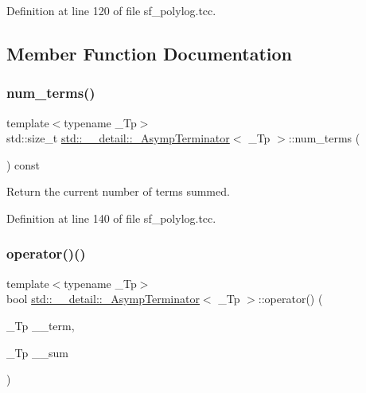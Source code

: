 Definition at line 120 of file sf\+\_\+polylog.\+tcc.



\subsection{Member Function Documentation}
\mbox{\label{classstd_1_1____detail_1_1__AsympTerminator_a463f9e4e87d22b9839c12cc28b085117}} 
\subsubsection{\texorpdfstring{num\+\_\+terms()}{num\_terms()}}
{\footnotesize\ttfamily template$<$typename \+\_\+\+Tp$>$ \\
std\+::size\+\_\+t \hyperlink{classstd_1_1____detail_1_1__AsympTerminator}{std\+::\+\_\+\+\_\+detail\+::\+\_\+\+Asymp\+Terminator}$<$ \+\_\+\+Tp $>$\+::num\+\_\+terms (\begin{DoxyParamCaption}{ }\end{DoxyParamCaption}) const\hspace{0.3cm}{\ttfamily [inline]}}



Return the current number of terms summed. 



Definition at line 140 of file sf\+\_\+polylog.\+tcc.

\mbox{\label{classstd_1_1____detail_1_1__AsympTerminator_ad57254b6dcdd419b785477711b296729}} 
\subsubsection{\texorpdfstring{operator()()}{operator()()}}
{\footnotesize\ttfamily template$<$typename \+\_\+\+Tp$>$ \\
bool \hyperlink{classstd_1_1____detail_1_1__AsympTerminator}{std\+::\+\_\+\+\_\+detail\+::\+\_\+\+Asymp\+Terminator}$<$ \+\_\+\+Tp $>$\+::operator() (\begin{DoxyParamCaption}\item[{\+\_\+\+Tp}]{\+\_\+\+\_\+term,  }\item[{\+\_\+\+Tp}]{\+\_\+\+\_\+sum }\end{DoxyParamCaption})\hspace{0.3cm}{\ttfamily [inline]}}



